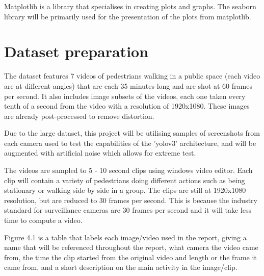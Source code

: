 \documentclass[12pt]{report}
\begin{document}
Matplotlib is a library that specialises in creating plots and graphs. The seaborn library will be primarily used for the presentation of the plots from matplotlib.

\section{Dataset preparation}

The dataset features 7 videos of pedestrians walking in a public space (each video are at different angles) that are each 35 minutes long and are shot at 60 frames per second. It also includes image subsets of the videos, each one taken every tenth of a second from the video with a resolution of 1920x1080. These images are already post-processed to remove distortion.

\vspace{2mm}

Due to the large dataset, this project will be utilising samples of screenshots from each camera used to test the capabilities of the 'yolov3' architecture, and will be augmented with artificial noise which allows for extreme test.

\vspace{2mm}

The videos are sampled to 5 - 10 second clips using windows video editor. Each clip will contain a variety of pedestrians doing different actions such as being stationary or walking side by side in a group. The clips are still at 1920x1080 resolution, but are reduced to 30 frames per second. This is because the industry standard for surveillance cameras are 30 frames per second and it will take less time to compute a video.

\vspace{2mm}

Figure 4.1 is a table that labels each image/video used in the report, giving a name that will be referenced throughout the report, what camera the video came from, the time the clip started from the original video and length or the frame it came from, and a short description on the main activity in the image/clip.

\vspace{5mm}
\end{document}
